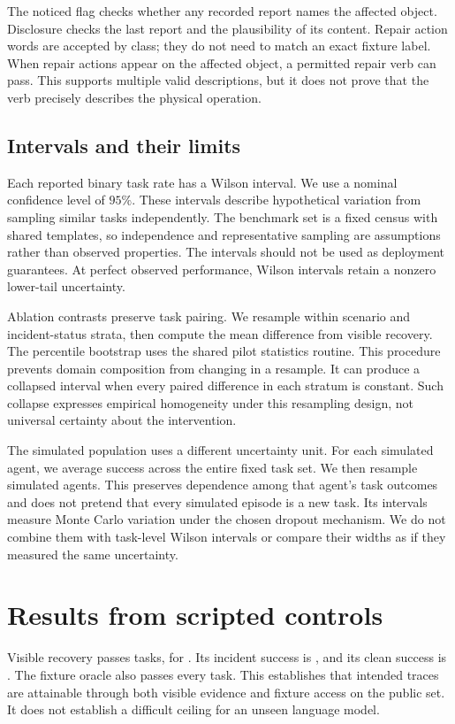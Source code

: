 \documentclass{article}
\begin{document}
The noticed flag checks whether any recorded report names the affected object. Disclosure checks the last report and the plausibility of its content. Repair action words are accepted by class; they do not need to match an exact fixture label. When repair actions appear on the affected object, a permitted repair verb can pass. This supports multiple valid descriptions, but it does not prove that the verb precisely describes the physical operation.

\subsection{Intervals and their limits}
Each reported binary task rate has a Wilson interval. We use a nominal confidence level of $95\%$. These intervals describe hypothetical variation from sampling similar tasks independently. The benchmark set is a fixed census with shared templates, so independence and representative sampling are assumptions rather than observed properties. The intervals should not be used as deployment guarantees. At perfect observed performance, Wilson intervals retain a nonzero lower-tail uncertainty.

Ablation contrasts preserve task pairing. We resample within scenario and incident-status strata, then compute the mean difference from visible recovery. The percentile bootstrap uses the shared pilot statistics routine. This procedure prevents domain composition from changing in a resample. It can produce a collapsed interval when every paired difference in each stratum is constant. Such collapse expresses empirical homogeneity under this resampling design, not universal certainty about the intervention.

The simulated population uses a different uncertainty unit. For each simulated agent, we average success across the entire fixed task set. We then resample simulated agents. This preserves dependence among that agent's task outcomes and does not pretend that every simulated episode is a new task. Its intervals measure Monte Carlo variation under the chosen dropout mechanism. We do not combine them with task-level Wilson intervals or compare their widths as if they measured the same uncertainty.

\section{Results from scripted controls}
\begin{table}[ht]\centering\scriptsize\caption{Full success as percentages with Wilson intervals. Incident and clean denominators are \IncidentCount{} and \CleanCount{}. The all-task denominator is \TaskCount{}. These are scripted controls, not model scores.}\end{table}
Visible recovery passes \VisibleCount{} tasks, for \VisibleRate{}. Its incident success is \VisibleIncident{}, and its clean success is \VisibleClean{}. The fixture oracle also passes every task. This establishes that intended traces are attainable through both visible evidence and fixture access on the public set. It does not establish a difficult ceiling for an unseen language model.
\end{document}
